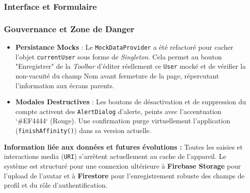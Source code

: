 \documentclass{article}
\begin{document}
\subsubsection{Interface et Formulaire}

\subsubsection{Gouvernance et Zone de Danger}
\begin{itemize}
    \item \textbf{Persistance Mocks} : Le \texttt{MockDataProvider} a été refactoré pour cacher l'objet \texttt{currentUser} sous forme de \textit{Singleton}. Cela permet au bouton "Enregistrer" de la \textit{Toolbar} d'éditer réellement ce \texttt{User} mocké et de vérifier la non-vacuité du champ Nom avant fermeture de la page, répercutant l'information aux écrans parents.
    \item \textbf{Modales Destructives} : Les boutons de désactivation et de suppression du compte activent des \texttt{AlertDialog} d'alerte, peints avec l'accentuation `#EF4444` (Rouge). Une confirmation purge virtuellement l'application (\texttt{finishAffinity()}) dans sa version actuelle.
\end{itemize}

\textbf{Information liée aux données et futures évolutions :} 
Toutes les saisies et interactions media (\texttt{URI}) s'arrêtent actuellement au cache de l'appareil. Le système est structuré pour une connexion ultérieure à \textbf{Firebase Storage} pour l'upload de l'avatar et à \textbf{Firestore} pour l'enregistrement robuste des champs de profil et du rôle d'authentification.
\end{document}
